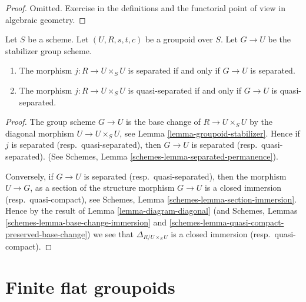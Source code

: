 \begin{proof}
Omitted.
Exercise in the definitions and the functorial point of
view in algebraic geometry.
\end{proof}

\begin{lemma}
\label{lemma-diagonal}
Let $S$ be a scheme.
Let $(U, R, s, t, c)$ be a groupoid over $S$.
Let $G \to U$ be the stabilizer group scheme.
\begin{enumerate}
\item The morphism $j : R \to U \times_S U$ is separated if and only if
$G \to U$ is separated.
\item The morphism $j : R \to U \times_S U$ is quasi-separated if and only
if $G \to U$ is quasi-separated.
\end{enumerate}
\end{lemma}

\begin{proof}
The group scheme $G \to U$ is the base change of $R \to U \times_S U$
by the diagonal morphism $U \to U \times_S U$, see
Lemma \ref{lemma-groupoid-stabilizer}. Hence if
$j$ is separated (resp.\ quasi-separated),
then $G \to U$ is separated (resp.\ quasi-separated).
(See Schemes, Lemma
\ref{schemes-lemma-separated-permanence}).

\medskip\noindent
Conversely, if $G \to U$ is separated
(resp.\ quasi-separated), then the morphism $U \to G$, as a section
of the structure morphism $G \to U$ is a closed immersion
(resp.\ quasi-compact), see
Schemes, Lemma \ref{schemes-lemma-section-immersion}.
Hence by the result of Lemma \ref{lemma-diagram-diagonal}
(and Schemes, Lemmas \ref{schemes-lemma-base-change-immersion}
and \ref{schemes-lemma-quasi-compact-preserved-base-change})
we see that $\Delta_{R/U \times_S U}$ is a closed
immersion (resp.\ quasi-compact).
\end{proof}









\section{Finite flat groupoids}
\label{section-finite-flat}


